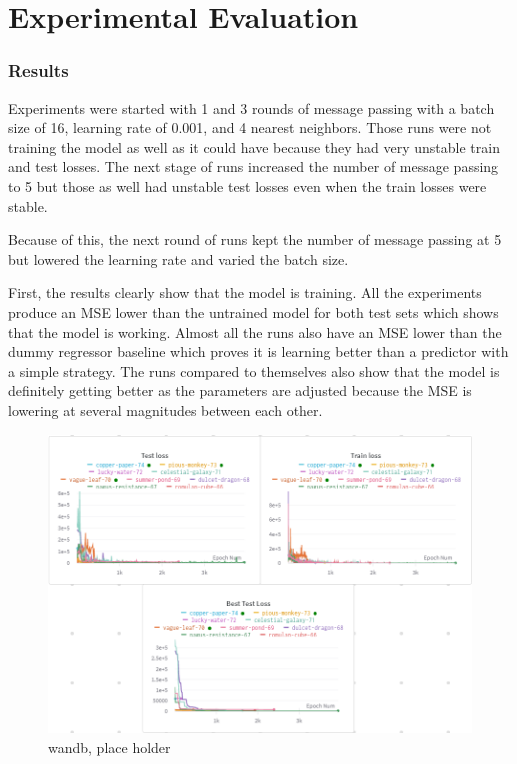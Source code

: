 \documentclass[12pt]{scrartcl}
\begin{document}
\section{Experimental Evaluation}
\subsubsection{Results} 
Experiments were started with 1 and 3 rounds of message passing with a batch size of 16, learning rate of 0.001, and 4 nearest neighbors. Those runs were not training the model as well as it could have because they had very unstable train and test losses. The next stage of runs increased the number of message passing to 5 but those as well had unstable test losses even when the train losses were stable. 


Because of this, the next round of runs kept the number of message passing at 5 but lowered the learning rate and varied the batch size. 

First, the results clearly show that the model is training. All the experiments produce an MSE lower than the untrained model for both test sets which shows that the model is working. Almost all the runs also have an MSE lower than the dummy regressor baseline which proves it is learning better than a predictor with a simple strategy. The runs compared to themselves also show that the model is definitely getting better as the parameters are adjusted because the MSE is lowering at several magnitudes between each other.

\begin{figure}
  \centering
  \includegraphics[scale=.75]{graph.png}
  
  \caption{wandb, place holder}\label{fig:graph}
\end{figure}
\end{document}
